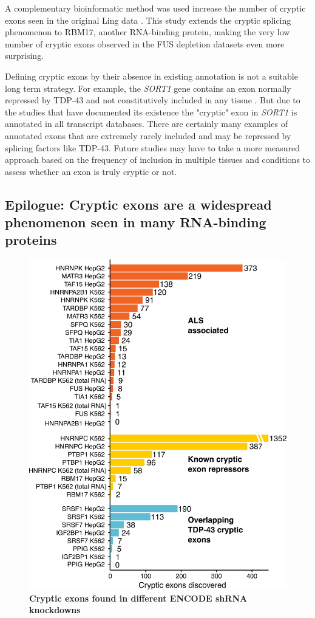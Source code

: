 A complementary bioinformatic method was used increase the number of cryptic exons seen in the original Ling data \citep{Tan2016}. This study extends the cryptic splicing phenomenon to RBM17, another RNA-binding protein, making the very low number of cryptic exons observed in the FUS depletion datasets even more surprising.

Defining cryptic exons by their absence in existing annotation is not a suitable long term strategy. For example, the \textit{SORT1} gene contains an exon normally repressed by TDP-43 and not constitutively included in any tissue \citep{Prudencio2012}. But due to the studies that have documented its existence the "cryptic" exon in \textit{SORT1} is annotated in all transcript databases. There are certainly many examples of annotated exons that are extremely rarely included and may be repressed by splicing factors like TDP-43. Future studies may have to take a more measured approach based on the frequency of inclusion in multiple tissues and conditions to assess whether an exon is truly cryptic or not.


\subsection{Epilogue: Cryptic exons are a widespread phenomenon seen in many RNA-binding proteins}

\begin{figure}[h!]
	\centering
	\includegraphics[width=12cm]{Figures/03_cryptic_exons/all_ENCODE_cryptex_counts.png}
	\caption[Cryptic exons found in different ENCODE shRNA knockdowns]{\textbf{Cryptic exons found in different ENCODE shRNA knockdowns}}
	\label{fig:cryptic_counts}
\end{figure}

